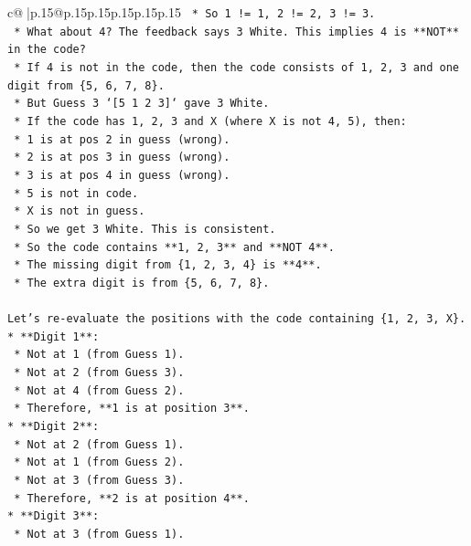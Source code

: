 \documentclass{article}
\begin{document}
{\begin{supertabular}{c@{$\;$}|p{.15\linewidth}@{}p{.15\linewidth}p{.15\linewidth}p{.15\linewidth}p{.15\linewidth}p{.15\linewidth}}
{{{\texttt{    *   So 1 != 1, 2 != 2, 3 != 3.} \\
\texttt{    *   What about 4? The feedback says 3 White. This implies 4 is **NOT** in the code?} \\
\texttt{    *   If 4 is not in the code, then the code consists of 1, 2, 3 and one digit from \{5, 6, 7, 8\}.} \\
\texttt{    *   But Guess 3 `{[}5 1 2 3{]}` gave 3 White.} \\
\texttt{    *   If the code has 1, 2, 3 and X (where X is not 4, 5), then:} \\
\texttt{        *   1 is at pos 2 in guess (wrong).} \\
\texttt{        *   2 is at pos 3 in guess (wrong).} \\
\texttt{        *   3 is at pos 4 in guess (wrong).} \\
\texttt{        *   5 is not in code.} \\
\texttt{        *   X is not in guess.} \\
\texttt{        *   So we get 3 White. This is consistent.} \\
\texttt{    *   So the code contains **1, 2, 3** and **NOT 4**.} \\
\texttt{    *   The missing digit from \{1, 2, 3, 4\} is **4**.} \\
\texttt{    *   The extra digit is from \{5, 6, 7, 8\}.} \\
\\ 
\texttt{Let's re{-}evaluate the positions with the code containing \{1, 2, 3, X\}.} \\
\texttt{*   **Digit 1**:} \\
\texttt{    *   Not at 1 (from Guess 1).} \\
\texttt{    *   Not at 2 (from Guess 3).} \\
\texttt{    *   Not at 4 (from Guess 2).} \\
\texttt{    *   Therefore, **1 is at position 3**.} \\
\texttt{*   **Digit 2**:} \\
\texttt{    *   Not at 2 (from Guess 1).} \\
\texttt{    *   Not at 1 (from Guess 2).} \\
\texttt{    *   Not at 3 (from Guess 3).} \\
\texttt{    *   Therefore, **2 is at position 4**.} \\
\texttt{*   **Digit 3**:} \\
\texttt{    *   Not at 3 (from Guess 1).} \\
}}}
\end{supertabular}}
\end{document}
